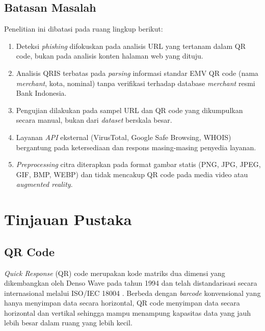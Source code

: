 \documentclass[conference]{IEEEtran}
\begin{document}
\subsection{Batasan Masalah}

Penelitian ini dibatasi pada ruang lingkup berikut:

\begin{enumerate}[label=\arabic*)]
    \item Deteksi \textit{phishing} difokuskan pada analisis URL yang tertanam dalam QR code, bukan pada analisis konten halaman web yang dituju.
    \item Analisis QRIS terbatas pada \textit{parsing} informasi standar EMV QR code (nama \textit{merchant}, kota, nominal) tanpa verifikasi terhadap database \textit{merchant} resmi Bank Indonesia.
    \item Pengujian dilakukan pada sampel URL dan QR code yang dikumpulkan secara manual, bukan dari \textit{dataset} berskala besar.
    \item Layanan \textit{API} eksternal (VirusTotal, Google Safe Browsing, WHOIS) bergantung pada ketersediaan dan respons masing-masing penyedia layanan.
    \item \textit{Preprocessing} citra diterapkan pada format gambar statis (PNG, JPG, JPEG, GIF, BMP, WEBP) dan tidak mencakup QR code pada media video atau \textit{augmented reality}.
\end{enumerate}

\section{Tinjauan Pustaka}

\subsection{QR Code}

\textit{Quick Response} (QR) code merupakan kode matriks dua dimensi yang dikembangkan oleh Denso Wave pada tahun 1994 dan telah distandarisasi secara internasional melalui ISO/IEC 18004 \cite{iso_18004_2015}. Berbeda dengan \textit{barcode} konvensional yang hanya menyimpan data secara horizontal, QR code menyimpan data secara horizontal dan vertikal sehingga mampu menampung kapasitas data yang jauh lebih besar dalam ruang yang lebih kecil.
\end{document}
